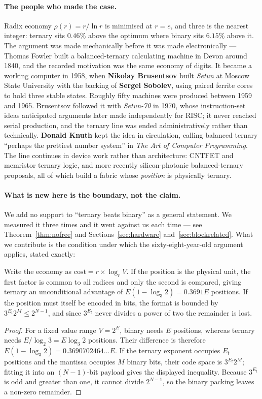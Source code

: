 \paragraph{The people who made the case.} Radix economy $\rho(r) = r/\ln r$ is
minimised at $r = e$, and three is the nearest integer: ternary sits $0.46\%$
above the optimum where binary sits $6.15\%$ above it. The argument was made
mechanically before it was made electronically --- Thomas Fowler built a
balanced-ternary calculating machine in Devon around 1840, and the recorded
motivation was the same economy of digits. It became a working computer in 1958,
when \textbf{Nikolay Brusentsov} built \emph{Setun} at Moscow State University
with the backing of \textbf{Sergei Sobolev}, using paired ferrite cores to hold
three stable states. Roughly fifty machines were produced between 1959 and 1965.
Brusentsov followed it with \emph{Setun-70} in 1970, whose instruction-set ideas
anticipated arguments later made independently for RISC; it never reached serial
production, and the ternary line was ended administratively rather than
technically. \textbf{Donald Knuth} kept the idea in circulation, calling balanced
ternary ``perhaps the prettiest number system'' in \emph{The Art of Computer
Programming}. The line continues in device work rather than architecture: CNTFET
and memristor ternary logic, and more recently silicon-photonic balanced-ternary
proposals, all of which build a fabric whose \emph{position} is physically
ternary.

\paragraph{What is new here is the boundary, not the claim.} We add no support to
``ternary beats binary'' as a general statement. We measured it three times and it
went against us each time --- see Theorem~\ref{thm:nofree} and
Sections~\ref{sec:hardware} and~\ref{sec:blockrelated}. What we contribute is the
condition under which the sixty-eight-year-old argument applies, stated exactly:

\begin{theorem}
\label{thm:boundary}
Write the economy as $\text{cost} = r \times \log_r V$. If the position is the
physical unit, the first factor is common to all radices and only the second is
compared, giving ternary an unconditional advantage of $E(1-\log_3 2) = 0.3691E$
positions. If the position must itself be encoded in bits, the format is bounded
by $3^{E_t} 2^{M} \le 2^{N-1}$, and since $3^{E_t}$ never divides a power of two
the remainder is lost.
\end{theorem}
\begin{proof}
For a fixed value range $V=2^E$, binary needs $E$ positions, whereas ternary
needs $E/\log_2 3=E\log_3 2$ positions. Their difference is therefore
$E(1-\log_3 2)=0.3690702464\ldots E$. If the ternary exponent occupies
$E_t$ positions and the mantissa occupies $M$ binary bits, their code space is
$3^{E_t}2^M$; fitting it into an $(N-1)$-bit payload gives the displayed
inequality. Because $3^{E_t}$ is odd and greater than one, it cannot divide
$2^{N-1}$, so the binary packing leaves a non-zero remainder.
\end{proof}

